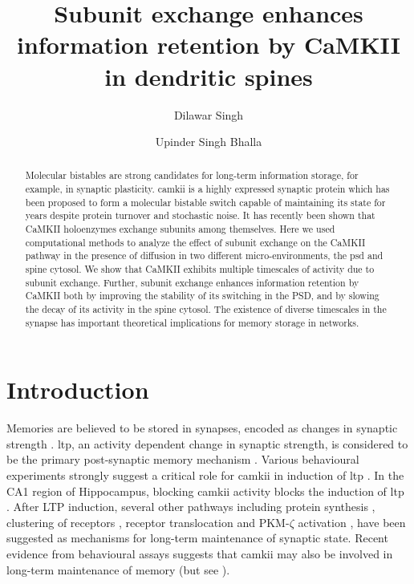 \documentclass[9pt,lineno,doublespacing]{elife}
\title{Subunit exchange enhances information retention by CaMKII in dendritic spines}
\author[]{Dilawar Singh}
\author[]{Upinder Singh Bhalla}
\affil[]{National Centre for Biological Sciences Bangalore, Tata Institute of Fundamental Research}
\begin{document}
\maketitle

\begin{abstract}\label{abstract} 

Molecular bistables are strong candidates for long-term information storage, for
example, in synaptic plasticity. \Gls{camkii} is a highly expressed synaptic
protein which has been proposed to form a molecular bistable switch capable of
maintaining its state for years despite protein turnover and stochastic noise.
It has recently been shown that CaMKII holoenzymes exchange subunits among
themselves. Here we used computational methods to analyze the effect of subunit
exchange on the CaMKII pathway in the presence of diffusion in two different
micro-environments, the \gls{psd} and spine cytosol. We show that CaMKII
exhibits multiple timescales of activity due to subunit exchange. Further,
subunit exchange enhances information retention by CaMKII both by improving the
stability of its switching in the PSD, and by slowing the decay of its activity
in the spine cytosol. The existence of diverse timescales in the synapse has
important theoretical implications for memory storage in networks.

\end{abstract}

\section{Introduction}\label{introduction}

Memories are believed to be stored in synapses, encoded as changes in synaptic
strength \citep{hebb_organization_2005,takeuchi_synaptic_2014,choi_interregional_2018}.
\gls{ltp}, an activity dependent change in synaptic strength, is considered to
be the primary post-synaptic memory mechanism
\citep{bliss_expression_2013,mayford_synapses_2012}. Various behavioural
experiments strongly suggest a critical role for \gls{camkii} in induction of
\gls{ltp} \citep{lucchesi_novel_2011,giese_autophosphorylation_1998}. In
the CA1 region of Hippocampus, blocking \gls{camkii} activity blocks the
induction of \gls{ltp} \citep{chang_camkii_2017}. After LTP induction, several
other pathways including protein synthesis \citep{aslam_translational_2009},
clustering of receptors \citep{shouval_clusters_2005}, receptor translocation
\citep{hayer_molecular_2005} and PKM-$\zeta$ activation
\citep{sacktor_memory_2012}, have been suggested as mechanisms for long-term
maintenance of synaptic state. Recent evidence from behavioural assays suggests
that \gls{camkii} may also be involved in long-term maintenance of memory
\citep{rossetti_memory_2017} (but see \citep{chang_camkii_2017}).
\end{document}
